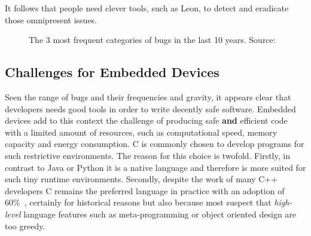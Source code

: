 \documentclass[a4paper,twoside]{article}
\begin{document}
It follows that people need clever tools, such as Leon, to detect and eradicate
those omnipresent issues.

\begin{figure}
\centering


\caption{The 3 most frequent categories of bugs in the last 10 years. Source:
\cite{cvedetails}}
\label{fig:bug_stats}

\end{figure}

\subsection{Challenges for Embedded Devices}

Seen the range of bugs and their frequencies and gravity, it appears clear that
developers needs good tools in order to write decently safe software. Embedded
devices add to this context the challenge of producing safe \textbf{and}
efficient code with a limited amount of resources, such as computational speed,
memory capacity and energy consumption. C is commonly chosen to develop programs
for such restrictive environments. The reason for this choice is twofold.
Firstly, in contrast to Java or Python it is a native language and therefore is
more suited for such tiny runtime environments. Secondly, despite the work of
many C++ developers C remains the preferred language in practice with an
adoption of 60\%~\cite{saks}, certainly for historical reasons but also because
most suspect that \textit{high-level} language features such as meta-programming
or object oriented design are too greedy.
\end{document}
